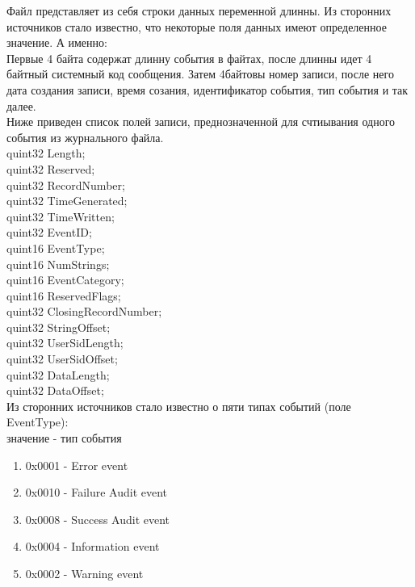 
Файл представляет из себя строки данных переменной длинны. Из сторонних источников стало известно, что некоторые поля данных имеют определенное значение. А именно: \\
Первые 4 байта содержат длинну события в файтах, после длинны идет 4 байтный системный код сообщения. Затем 4байтовы номер записи, после него дата создания записи, время созания, идентификатор события, тип события и так далее. \\

Ниже приведен список полей записи, преднозначенной для счтиывания одного события из журнального файла. \\

	quint32 Length; \\
	quint32 Reserved; \\
	quint32 RecordNumber; \\
	quint32 TimeGenerated; \\
	quint32 TimeWritten; \\
	quint32 EventID; \\
	quint16 EventType; \\
	quint16 NumStrings; \\
	quint16 EventCategory; \\
	quint16 ReservedFlags; \\
	quint32 ClosingRecordNumber; \\
	quint32 StringOffset; \\
	quint32 UserSidLength; \\
	quint32 UserSidOffset; \\
	quint32 DataLength; \\
	quint32 DataOffset; \\

Из сторонних источников стало известно о пяти типах событий (поле EventType): \\

значение - тип события \\

\begin{enumerate}
\item 0x0001 - Error event
\item 0x0010 - Failure Audit event
\item 0x0008 - Success Audit event
\item 0x0004 - Information event
\item 0x0002 - Warning event
\end{enumerate}


